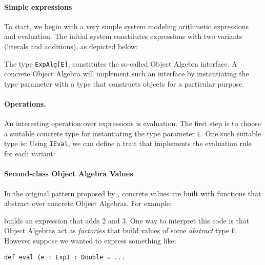 \paragraph{Simple expressions}
To start, we begin with a very simple system modeling arithmetic expressions and
evaluation. The initial system constitutes expressions with two variants
(literals and additions), as depicted below:

\noindent The type \lstinline{ExpAlg[E]}, constitutes the so-called Object
Algebra interface. A concrete Object Algebra will implement such an interface by
instantiating the type parameter with a type that constructs objects for a
particular purpose.


\paragraph{Operations.} An interesting operation over expressions is
evaluation. The first step is to choose a suitable concrete type for
instantiating the type parameter \lstinline{E}. One such suitable type is:
Using \lstinline{IEval}, we can define a trait that implements the evaluation
rule for each variant:

\paragraph{Second-class Object Algebra Values} In the original pattern
proposed by \citet{oliveira2012extensibility}, concrete values are built with
functions that abstract over concrete Object Algebras. For example:


\noindent builds an expression that adds $2$ and $3$. One way to
interpret this code is that Object Algebras act as \emph{factories}
that build values of some \emph{abstract} type \lstinline{E}. However
suppose we wanted to express something like:

\begin{lstlisting}
def eval (e : Exp) : Double = ...
\end{lstlisting}

